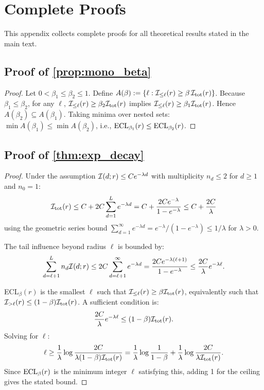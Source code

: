 \section{Complete Proofs}\label{app:proofs}

This appendix collects complete proofs for all theoretical results stated in the main text.

\subsection{Proof of \texorpdfstring{\cref{prop:mono_beta}}{Proposition: Monotonicity}}

\begin{proof}
Let $0<\beta_1\le \beta_2\le 1$. Define $A(\beta) := \{\ell:\mathcal{I}_{\le \ell}(r)\ge \beta\,\mathcal{I}_{\mathrm{tot}}(r)\}$.
Because $\beta_1\le \beta_2$, for any $\ell$, $\mathcal{I}_{\le \ell}(r)\ge \beta_2 \mathcal{I}_{\mathrm{tot}}(r)$ implies $\mathcal{I}_{\le \ell}(r)\ge \beta_1 \mathcal{I}_{\mathrm{tot}}(r)$. Hence $A(\beta_2)\subseteq A(\beta_1)$. Taking minima over nested sets: $\min A(\beta_1)\le \min A(\beta_2)$, i.e., $\mathrm{ECL}_{\beta_1}(r)\le \mathrm{ECL}_{\beta_2}(r)$.
\end{proof}

\subsection{Proof of \texorpdfstring{\cref{thm:exp_decay}}{Theorem: Exponential Decay Bound}}

\begin{proof}
Under the assumption $\mathcal{I}(d;r) \le C e^{-\lambda d}$ with multiplicity $n_d \le 2$ for $d \ge 1$ and $n_0 = 1$:
\[
\mathcal{I}_{\mathrm{tot}}(r) \le C + 2C \sum_{d=1}^{L} e^{-\lambda d} = C + \frac{2C e^{-\lambda}}{1-e^{-\lambda}} \le C + \frac{2C}{\lambda}
\]
using the geometric series bound $\sum_{d=1}^\infty e^{-\lambda d} = e^{-\lambda}/(1-e^{-\lambda}) \le 1/\lambda$ for $\lambda > 0$.

The tail influence beyond radius $\ell$ is bounded by:
\[
\sum_{d=\ell+1}^{L} n_d \mathcal{I}(d;r) \le 2C \sum_{d=\ell+1}^{\infty} e^{-\lambda d} = \frac{2C e^{-\lambda(\ell+1)}}{1-e^{-\lambda}} \le \frac{2C}{\lambda} e^{-\lambda \ell}.
\]

ECL$_\beta(r)$ is the smallest $\ell$ such that $\mathcal{I}_{\le \ell}(r) \ge \beta \mathcal{I}_{\mathrm{tot}}(r)$, equivalently such that $\mathcal{I}_{>\ell}(r) \le (1-\beta)\mathcal{I}_{\mathrm{tot}}(r)$. A sufficient condition is:
\[
\frac{2C}{\lambda} e^{-\lambda \ell} \le (1-\beta)\mathcal{I}_{\mathrm{tot}}(r).
\]
Solving for $\ell$:
\[
\ell \ge \frac{1}{\lambda}\log\frac{2C}{\lambda(1-\beta)\mathcal{I}_{\mathrm{tot}}(r)} = \frac{1}{\lambda}\log\frac{1}{1-\beta} + \frac{1}{\lambda}\log\frac{2C}{\lambda \mathcal{I}_{\mathrm{tot}}(r)}.
\]
Since $\mathrm{ECL}_\beta(r)$ is the minimum integer $\ell$ satisfying this, adding 1 for the ceiling gives the stated bound.
\end{proof}


